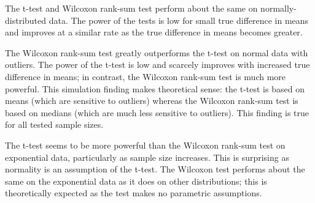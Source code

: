 \documentclass{report}
\begin{document}
The t-test and Wilcoxon rank-sum
test perform about the same on normally-distributed data. The power of the tests
is low for small true difference in means and improves at a similar rate as the
true difference in means becomes greater.

The Wilcoxon rank-sum test greatly outperforms the t-test on normal
data with outliers. The power of the t-test is low and scarcely improves with
increased true difference in means; in contrast, the Wilcoxon rank-sum test is
much more powerful. This simulation finding makes theoretical sense: the
t-test is based on means (which are sensitive to outliers) whereas the
Wilcoxon rank-sum test is based on medians (which are much less
sensitive to outliers). This finding is true for all tested sample sizes.

The t-test seems to be more powerful than the Wilcoxon rank-sum test on exponential data,
particularly as sample size increases. This is surprising as normality is an
assumption of the t-test. The Wilcoxon test performs about the same on the
exponential data as it does on other distributions; this is theoretically
expected as the test makes no parametric assumptions.
\end{document}
